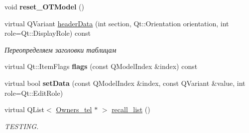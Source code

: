 \begin{DoxyCompactItemize}
\mbox{\label{class_m_t_m___ow_tel_aeb2f44d9fff39e0688d8ae8a531927d4}} 
void {\bfseries reset\+\_\+\+O\+T\+Model} ()
\item 
\mbox{\label{class_m_t_m___ow_tel_aba95e3cb1840a9e27215ffaad154897c}} 
virtual Q\+Variant \mbox{\hyperlink{class_m_t_m___ow_tel_aba95e3cb1840a9e27215ffaad154897c}{header\+Data}} (int section, Qt\+::\+Orientation orientation, int role=Qt\+::\+Display\+Role) const
\begin{DoxyCompactList}\small\item\em Переопределяем заголовки таблицам \end{DoxyCompactList}\item 
\mbox{\label{class_m_t_m___ow_tel_ae1a1243ca4989005455889ff834e2f25}} 
virtual Qt\+::\+Item\+Flags {\bfseries flags} (const Q\+Model\+Index \&index) const
\item 
\mbox{\label{class_m_t_m___ow_tel_aab4d35a7939b724c2d51ad7ee6a4f6ca}} 
virtual bool {\bfseries set\+Data} (const Q\+Model\+Index \&index, const Q\+Variant \&value, int role=Qt\+::\+Edit\+Role)
\item 
\mbox{\label{class_m_t_m___ow_tel_a7917948de8910176f08af17babc49f04}} 
virtual Q\+List$<$ \mbox{\hyperlink{class_owners__tel}{Owners\+\_\+tel}} $\ast$ $>$ \mbox{\hyperlink{class_m_t_m___ow_tel_a7917948de8910176f08af17babc49f04}{recall\+\_\+list}} ()
\begin{DoxyCompactList}\small\item\em T\+E\+S\+T\+I\+NG. \end{DoxyCompactList}\end{DoxyCompactItemize}
